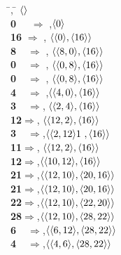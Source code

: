 \begin{tabbing}
  \hspace{3.6cm}\=\cache{\Lambda}{\Lambda}{\Lambda}{\Lambda}, \hspace{3cm}\= $\langle\rangle$
\hspace{.75cm}\\
{\bf 0\ \ } $\Rightarrow$ \miss\>,\>$\langle 0\rangle$ \\
{\bf 16} $\Rightarrow$ \miss\>, \>$\langle\langle0\rangle,\langle16\rangle\rangle$\\
{\bf 8\ \ }$\Rightarrow$ \miss\>, \>$\langle\langle8,0\rangle, \langle16\rangle\rangle$\\
{\bf 0\ \ }$\Rightarrow$ \HIT \> ,\> $\langle\langle0,8\rangle, \langle16\rangle\rangle$\\
{\bf 0\ \ }$\Rightarrow$ \HIT \> , \>$\langle\langle0,8\rangle, \langle16\rangle\rangle$\\
{\bf 4\ \ }$\Rightarrow$\miss\> ,\>$\langle\langle4,0\rangle, \langle16\rangle\rangle$\\
{\bf 3\ \ }$\Rightarrow$\miss\>,\> $\langle\langle2,4\rangle, \langle16\rangle\rangle$\\
{\bf 12}$\Rightarrow$\miss\>,\> $\langle\langle12,2\rangle, \langle16\rangle\rangle$\\
{\bf 3\ \ }$\Rightarrow$\HIT\>,\>$\langle\langle2,12\rangle1~, \langle16\rangle\rangle$\\
{\bf 11}$\Rightarrow$\miss\>,\> $\langle\langle12,2\rangle, \langle16\rangle\rangle$\\
{\bf 12}$\Rightarrow$\HIT\>,\>$\langle\langle10,12\rangle, \langle16\rangle\rangle$\\
{\bf 21}$\Rightarrow$\miss\>,\>$\langle\langle12,10\rangle,\langle20,16\rangle\rangle$\\
{\bf 21}$\Rightarrow$\HIT\>,\>$\langle\langle12,10\rangle,\langle20,16\rangle\rangle$\\
{\bf 22}$\Rightarrow$\miss\>,\>$\langle\langle12,10\rangle, \langle22,20\rangle\rangle$\\
{\bf 28}$\Rightarrow$\miss\>,\>$\langle\langle12,10\rangle, \langle28,22\rangle\rangle$\\
{\bf 6\ \ }$\Rightarrow$\miss\>,\>$\langle\langle 6,12\rangle,\langle 28,22\rangle\rangle$\\
{\bf 4\ \ }$\Rightarrow$\miss\>,\>$\langle\langle4,6\rangle, \langle28,22\rangle\rangle$\\
\end{tabbing}



